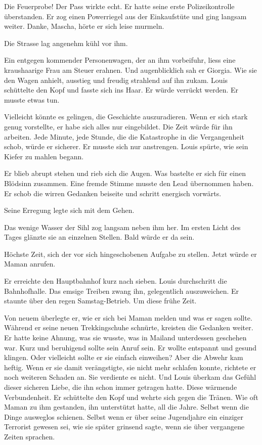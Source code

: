Die Feuerprobe! Der Pass wirkte echt. Er hatte seine erste
Polizeikontrolle überstanden. Er zog einen Powerriegel aus der
Einkaufstüte und ging langsam weiter. Danke, Mascha, hörte er sich leise
murmeln.

Die Strasse lag angenehm kühl vor ihm.

Ein entgegen kommender Personenwagen, der an ihm vorbeifuhr, liess eine
kraushaarige Frau am Steuer erahnen. Und augenblicklich sah er Giorgia.
Wie sie den Wagen anhielt, ausstieg und freudig strahlend auf ihn zukam.
Louis schüttelte den Kopf und fasste sich ins Haar. Er würde verrückt
werden. Er musste etwas tun.

Vielleicht könnte es gelingen, die Geschichte auszuradieren. Wenn er
sich stark genug vorstellte, er habe sich alles nur eingebildet. Die
Zeit würde für ihn arbeiten. Jede Minute, jede Stunde, die die
Katastrophe in die Vergangenheit schob, würde er sicherer. Er musste
sich nur anstrengen. Louis spürte, wie sein Kiefer zu mahlen begann.

Er blieb abrupt stehen und rieb sich die Augen. Was bastelte er sich für
einen Blödsinn zusammen. Eine fremde Stimme musste den Lead übernommen
haben. Er schob die wirren Gedanken beiseite und schritt energisch
vorwärts.

Seine Erregung legte sich mit dem Gehen.

Das wenige Wasser der Sihl zog langsam neben ihm her. Im ersten Licht
des Tages glänzte sie an einzelnen Stellen. Bald würde er da sein.

Höchste Zeit, sich der vor sich hingeschobenen Aufgabe zu stellen. Jetzt
würde er Maman anrufen.

Er erreichte den Hauptbahnhof kurz nach sieben. Louis durchschritt die
Bahnhofhalle. Das emsige Treiben zwang ihn, gelegentlich auszuweichen.
Er staunte über den regen Samstag-Betrieb. Um diese frühe Zeit.

Von neuem überlegte er, wie er sich bei Maman melden und was er sagen
sollte. Während er seine neuen Trekkingschuhe schnürte, kreisten die
Gedanken weiter. Er hatte keine Ahnung, was sie wusste, was in Mailand
unterdessen geschehen war. Kurz und beruhigend sollte sein Anruf sein.
Er wollte entspannt und gesund klingen. Oder vielleicht sollte er sie
einfach einweihen? Aber die Abwehr kam heftig. Wenn er sie damit
verängstigte, sie nicht mehr schlafen konnte, richtete er noch weiteren
Schaden an. Sie verdiente es nicht. Und Louis überkam das Gefühl dieser
sicheren Liebe, die ihn schon immer getragen hatte. Diese wärmende
Verbundenheit. Er schüttelte den Kopf und wehrte sich gegen die Tränen.
Wie oft Maman zu ihm gestanden, ihn unterstützt hatte, all die Jahre.
Selbst wenn die Dinge ausweglos schienen. Selbst wenn er über seine
Jugendjahre ein einziger Terrorist gewesen sei, wie sie später grinsend
sagte, wenn sie über vergangene Zeiten sprachen.

